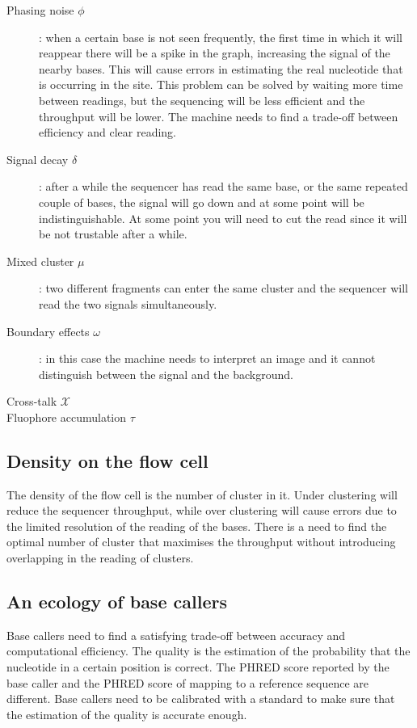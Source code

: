 	\begin{multicols}{2}
		\begin{description}
			\item[Phasing noise $\phi$]: when a certain base is not seen frequently, the first time in which it will reappear there will be a spike in the graph, increasing the signal of the nearby bases.
				This will cause errors in estimating the real nucleotide that is occurring in the site.
				This problem can be solved by waiting more time between readings, but the sequencing will be less efficient and the throughput will be lower.
				The machine needs to find a trade-off between efficiency and clear reading.
			\item[Signal decay $\delta$]: after a while the sequencer has read the same base, or the same repeated couple of bases, the signal will go down and at some point will be indistinguishable.
				At some point you will need to cut the read since it will be not trustable after a while.
			\item[Mixed cluster $\mu$]: two different fragments can enter the same cluster and the sequencer will read the two signals simultaneously.
			\item[Boundary effects $\omega$]:  in this case the machine needs to interpret an image and it cannot distinguish between the signal and the background.
			\item[Cross-talk $\mathcal{X}$]
			\item[Fluophore accumulation $\tau$]
		\end{description}
	\end{multicols}

	\subsection{Density on the flow cell}
	The density of the flow cell is the number of cluster in it.
	Under clustering will reduce the sequencer throughput, while over clustering will cause errors due to the limited resolution of the reading of the bases.
	There is a need to find the optimal number of cluster that maximises the throughput without introducing overlapping in the reading of clusters.

	\subsection{An ecology of base callers}
	Base callers need to find a satisfying trade-off between accuracy and computational efficiency.
	The quality is the estimation of the probability that the nucleotide in a certain position is correct.
	The PHRED score reported by the base caller and the PHRED score of mapping to a reference sequence are different.
	Base callers need to be calibrated with a standard to make sure that the estimation of the quality is accurate enough.

